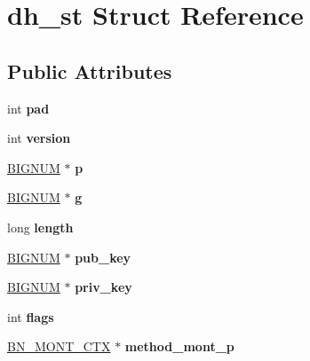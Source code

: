 \hypertarget{structdh__st}{}\section{dh\+\_\+st Struct Reference}
\label{structdh__st}
\subsection*{Public Attributes}
\begin{DoxyCompactItemize}
\item 
\mbox{\label{structdh__st_aae482b7bef6f43b8299ed2bdd1f658c9}} 
int {\bfseries pad}
\item 
\mbox{\label{structdh__st_a661645628bf9785abcb0c7f19946a789}} 
int {\bfseries version}
\item 
\mbox{\label{structdh__st_ad517b332a9e3129370371922b68336b8}} 
\hyperlink{structbignum__st}{B\+I\+G\+N\+UM} $\ast$ {\bfseries p}
\item 
\mbox{\label{structdh__st_aa4bceea00e97aad49a2fd04b0e552f4f}} 
\hyperlink{structbignum__st}{B\+I\+G\+N\+UM} $\ast$ {\bfseries g}
\item 
\mbox{\label{structdh__st_ac1a24166e9a30f03bd66fcd8713e560f}} 
long {\bfseries length}
\item 
\mbox{\label{structdh__st_aad2b90e2aa4a6bea39d10a99bcf88324}} 
\hyperlink{structbignum__st}{B\+I\+G\+N\+UM} $\ast$ {\bfseries pub\+\_\+key}
\item 
\mbox{\label{structdh__st_a3c4e1fb7d7fb23191ec0c4f1229566e2}} 
\hyperlink{structbignum__st}{B\+I\+G\+N\+UM} $\ast$ {\bfseries priv\+\_\+key}
\item 
\mbox{\label{structdh__st_a6edfd86d7930e5a1c3708f822c9b2680}} 
int {\bfseries flags}
\item 
\mbox{\label{structdh__st_a2c49ea291e7d1b359a944e3d807a842f}} 
\hyperlink{structbn__mont__ctx__st}{B\+N\+\_\+\+M\+O\+N\+T\+\_\+\+C\+TX} $\ast$ {\bfseries method\+\_\+mont\+\_\+p}
\item 

\end{DoxyCompactItemize}
